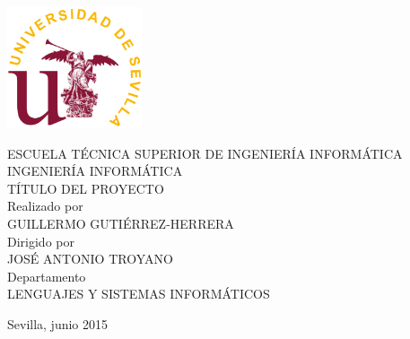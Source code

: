 
\begin{center}
\includegraphics[width=4cm]{logo_us}


\Large

ESCUELA TÉCNICA SUPERIOR DE INGENIERÍA INFORMÁTICA\\[0.5cm]

INGENIERÍA INFORMÁTICA\\[0.5cm]

TÍTULO DEL PROYECTO\\[0.5cm]

Realizado por\\[0.5cm]

GUILLERMO GUTIÉRREZ-HERRERA\\[0.5cm]

Dirigido por\\[0.5cm]

JOSÉ ANTONIO TROYANO\\[0.5cm]

Departamento\\[0.5cm]

LENGUAJES Y SISTEMAS INFORMÁTICOS\\[0.5cm]


\end{center}



Sevilla, junio 2015

